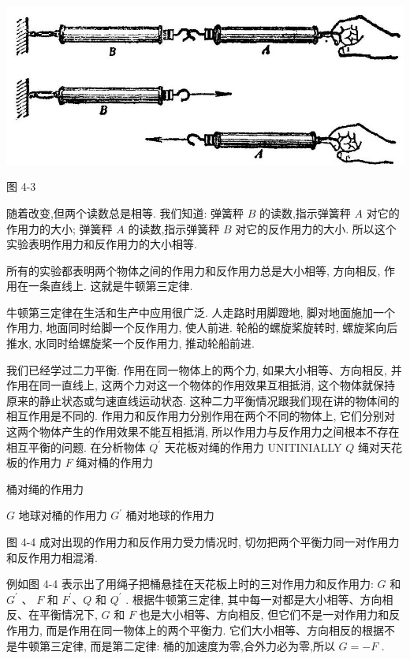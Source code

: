 \documentclass[10pt]{article}
\begin{document}
\begin{center}
\includegraphics[max width=1.0\textwidth]{images/01912d55-147c-70aa-b0e0-1782a122f948_113_477848.jpg}
\end{center}

图 4-3

随着改变,但两个读数总是相等. 我们知道: 弹簧秤 \(B\) 的读数,指示弹簧秤 \(A\) 对它的作用力的大小; 弹簧秤 \(A\) 的读数,指示弹簧秤 \(B\) 对它的反作用力的大小. 所以这个实验表明作用力和反作用力的大小相等.

所有的实验都表明两个物体之间的作用力和反作用力总是大小相等, 方向相反, 作用在一条直线上. 这就是牛顿第三定律.

牛顿第三定律在生活和生产中应用很广泛. 人走路时用脚蹬地, 脚对地面施加一个作用力, 地面同时给脚一个反作用力, 使人前进. 轮船的螺旋桨旋转时, 螺旋桨向后推水, 水同时给螺旋桨一个反作用力, 推动轮船前进.

我们已经学过二力平衡. 作用在同一物体上的两个力, 如果大小相等、方向相反, 并作用在同一直线上, 这两个力对这一个物体的作用效果互相抵消, 这个物体就保持原来的静止状态或匀速直线运动状态. 这种二力平衡情况跟我们现在讲的物体间的相互作用是不同的. 作用力和反作用力分别作用在两个不同的物体上, 它们分别对这两个物体产生的作用效果不能互相抵消, 所以作用力与反作用力之间根本不存在相互平衡的问题. 在分析物体 \({Q}^{\prime }\) 天花板对绳的作用力 UNITINIALLY \(Q\) 绳对天花板的作用力 \(F\) 绳对桶的作用力

\begin{mdframed}

桶对绳的作用力

\(G\) 地球对桶的作用力 \({G}^{\prime }\) 桶对地球的作用力

图 4-4 成对出现的作用力和反作用力受力情况时, 切勿把两个平衡力同一对作用力和反作用力相混淆.

\end{mdframed}

例如图 4-4 表示出了用绳子把桶悬挂在天花板上时的三对作用力和反作用力: \(G\) 和 \({G}^{\prime }\) 、 \(F\) 和 \({F}^{\prime }\text{、}Q\) 和 \({Q}^{\prime }\) . 根据牛顿第三定律, 其中每一对都是大小相等、方向相反、在平衡情况下, \(G\) 和 \(F\) 也是大小相等、方向相反, 但它们不是一对作用力和反作用力, 而是作用在同一物体上的两个平衡力. 它们大小相等、方向相反的根据不是牛顿第三定律, 而是第二定律: 桶的加速度为零,合外力必为零,所以 \(G = - F\) .
\end{document}
